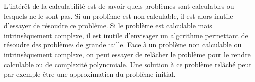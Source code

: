 L'intérêt de la calculabilité est de savoir quels problèmes sont calculables ou lesquels ne le sont pas. Si un problème est non calculable, il est alors inutile  d'essayer de résoudre ce problème.  Si le problème est calculable mais intrinsèquement complexe, il est inutile d'envisager un algorithme permettant de résoudre des problèmes de grande taille.
Face à un problème non calculable ou intrinsèquement complexe, on peut essayer de relâcher le problème pour le rendre calculable ou de complexité polynomiale. Une solution à ce problème relâché peut par exemple être une approximation du problème initial.


